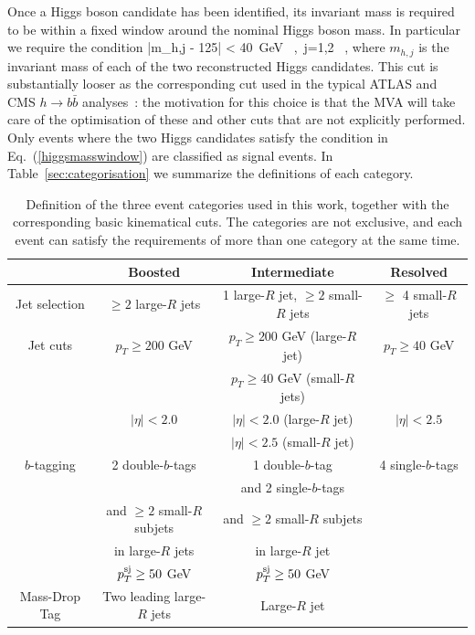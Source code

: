 Once a Higgs boson candidate has been identified,
its invariant mass is required to be within a fixed window
around the nominal Higgs boson mass.
%
In particular we require the condition
\be
\label{higgsmasswindow}
|m_{h,j} - 125| < 40~{\rm GeV} \, ,\, j=1,2 \, ,
\ee
where $m_{h,j}$ is the invariant mass of each of the two reconstructed  Higgs candidates.
%
This cut is substantially looser as the corresponding
cut used in the typical ATLAS and CMS $h\to b\bar{b}$
analyses~\cite{Aad:2012gxa,Chatrchyan:2013zna}: the motivation
for this choice is that the MVA will take care of the optimisation of these
and other cuts that are not explicitly performed.
%
Only events where the two Higgs candidates satisfy the
condition in Eq.~(\ref{higgsmasswindow}) are classified as signal events.
%
In Table~\ref{sec:categorisation} we summarize the definitions of each
category.
%



\begin{table}[h]
  \centering
  \small
  \begin{tabular}{c|c|c|c}
    \hline
    &  Boosted  &  Intermediate  &  Resolved \\
    \hline
    \hline 
    Jet selection  &  $\ge 2$ large-$R$ jets  & 1 large-$R$ jet, $\ge 2$ small-$R$
    jets  &  $\ge$ 4 small-$R$ jets \\[0.2cm]
    \hline
    Jet cuts  & $p_T \ge 200$ GeV   &  $p_T \ge 200$ GeV (large-$R$ jet)
    &  $p_T \ge 40$ GeV \\
    &  & $p_T \ge 40$ GeV (small-$R$ jets)   &    \\
    &   $|\eta|<2.0$  & $|\eta|<2.0$ (large-$R$ jet) & $|\eta|<2.5$ \\
    &        & $|\eta|<2.5$ (small-$R$ jet)  &  \\[0.2cm]
    \hline
    $b$-tagging  & 2 double-$b$-tags  & 1 double-$b$-tag & 4 single-$b$-tags \\
    &  & and 2 single-$b$-tags  &  \\
    & and $\ge 2$ small-$R$ subjets  &  and $\ge 2$ small-$R$ subjets  &  \\
     &  in large-$R$ jets  &  in large-$R$ jet &  \\
    &  $p_T^{\rm sj}\ge 50$ GeV & $p_T^{\rm sj}\ge 50$ GeV   &  \\[0.2cm]
    \hline
    Mass-Drop Tag  &  Two leading large-$R$ jets  &  Large-$R$ jet &   \\
    \hline
    \end{tabular}
  \caption{\small Definition of the three event categories used in this
    work, together with the corresponding basic kinematical cuts.
    The categories are not exclusive, and each event can satisfy the
    requirements of more than one category at the same time.  
\label{sec:categorisationTable}
  }
\end{table}

